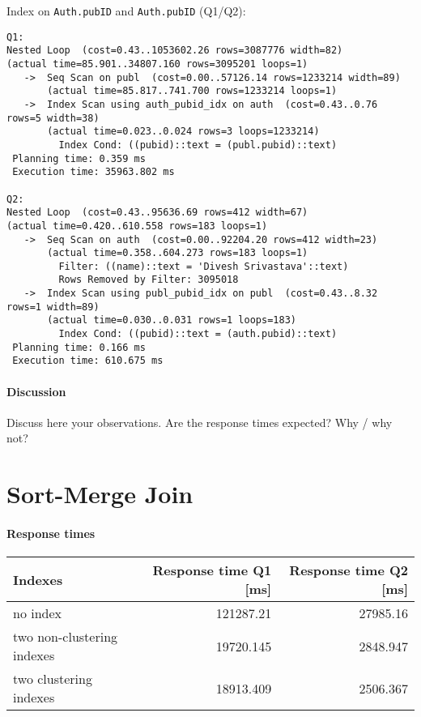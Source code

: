 \documentclass[11pt]{scrartcl}
\begin{document}
\noindent Index on {\tt Auth.pubID} and {\tt Auth.pubID} (Q1/Q2):
{\small
\begin{verbatim}
Q1:
Nested Loop  (cost=0.43..1053602.26 rows=3087776 width=82)
(actual time=85.901..34807.160 rows=3095201 loops=1)
   ->  Seq Scan on publ  (cost=0.00..57126.14 rows=1233214 width=89)
       (actual time=85.817..741.700 rows=1233214 loops=1)
   ->  Index Scan using auth_pubid_idx on auth  (cost=0.43..0.76 rows=5 width=38)
       (actual time=0.023..0.024 rows=3 loops=1233214)
         Index Cond: ((pubid)::text = (publ.pubid)::text)
 Planning time: 0.359 ms
 Execution time: 35963.802 ms

Q2:
Nested Loop  (cost=0.43..95636.69 rows=412 width=67)
(actual time=0.420..610.558 rows=183 loops=1)
   ->  Seq Scan on auth  (cost=0.00..92204.20 rows=412 width=23)
       (actual time=0.358..604.273 rows=183 loops=1)
         Filter: ((name)::text = 'Divesh Srivastava'::text)
         Rows Removed by Filter: 3095018
   ->  Index Scan using publ_pubid_idx on publ  (cost=0.43..8.32 rows=1 width=89)
       (actual time=0.030..0.031 rows=1 loops=183)
         Index Cond: ((pubid)::text = (auth.pubid)::text)
 Planning time: 0.166 ms
 Execution time: 610.675 ms
\end{verbatim}
}

\paragraph{Discussion}
Discuss here your observations. Are the response times expected? Why / why
not? 

\section{Sort-Merge Join}

\paragraph{Response times}

\begin{flushleft}
\begin{tabular}{l|r|r}
  Indexes & Response time Q1 [ms] & Response time Q2 [ms] \\
  \hline
  no index & 121287.21 & 27985.16 \\
  two non-clustering indexes & 19720.145 & 2848.947 \\
  two clustering indexes & 18913.409 & 2506.367  \\
\end{tabular}
\end{flushleft}
\end{document}
